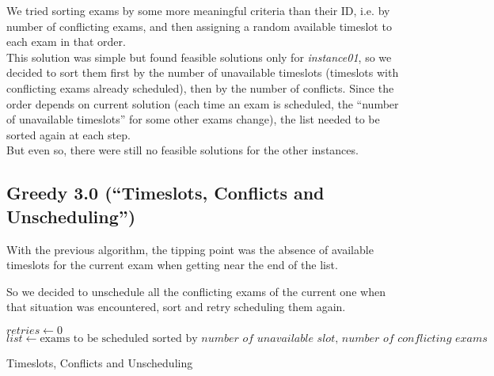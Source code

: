 \documentclass[11pt, a4paper, leqno]{article}
\begin{document}
	We tried sorting exams by some more meaningful criteria than their ID, i.e. by number of conflicting exams, and then assigning a random available timeslot to each exam in that order.\\
	This solution was simple but found feasible solutions only for \textit{instance01}, so we decided to sort them first by the number of unavailable timeslots (timeslots with conflicting exams already scheduled), then by the number of conflicts. Since the order depends on current solution (each time an exam is scheduled, the ``number of unavailable timeslots'' for some other exams change), the list needed to be sorted again at each step.\\
	But even so, there were still no feasible solutions for the other instances.
	
	\subsection{Greedy 3.0 (``Timeslots, Conflicts and Unscheduling'')}
	
	With the previous algorithm, the tipping point was the absence of available timeslots for the current exam when getting near the end of the list.
	
	So we decided to unschedule all the conflicting exams of the current one when that situation was encountered, sort and retry scheduling them again.
	
	\begin{algorithm}[H]
		$retries \gets 0$\;
		$list \gets \text{exams to be scheduled sorted by }\textit{number of unavailable slot, number of conflicting exams}$\;
		\;
		\caption{Timeslots, Conflicts and Unscheduling}
	\end{algorithm}
	
\end{document}
